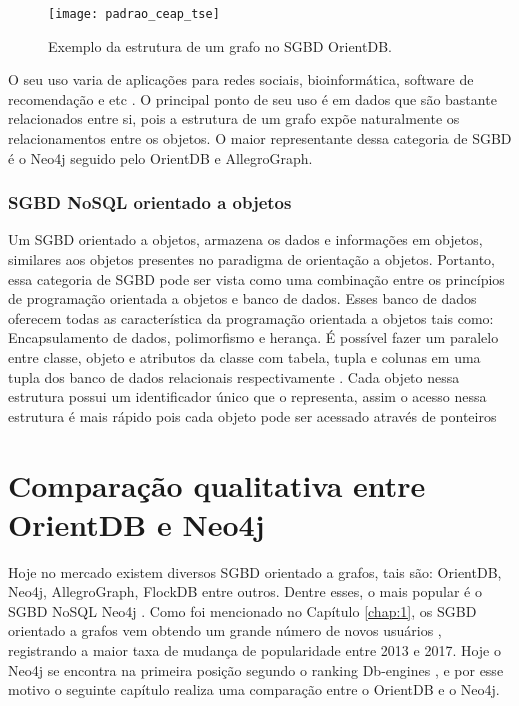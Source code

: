 \begin{figure}[h]
	\centering
    \texttt{[image: padrao\_ceap\_tse]}
    \caption{Exemplo da estrutura de um grafo no SGBD OrientDB.}
    \label{fig:graph_orientdb}
\end{figure}
	
	O seu uso varia de aplicações para redes sociais, bioinformática, software de recomendação e etc \cite{nayak2013type}. O principal ponto de seu uso é em dados que são bastante relacionados entre si, pois a estrutura de um grafo expõe naturalmente os relacionamentos entre os objetos. O maior representante dessa categoria de SGBD é o Neo4j seguido pelo OrientDB e AllegroGraph.
	
\subsubsection{SGBD NoSQL orientado a objetos}
	Um SGBD orientado a objetos, armazena os dados e informações em objetos, similares aos objetos presentes no paradigma de orientação a objetos. Portanto, essa categoria de SGBD pode ser vista como uma combinação entre os princípios de programação orientada a objetos e banco de dados. Esses banco de dados oferecem todas as característica da programação orientada a objetos tais como: Encapsulamento de dados, polimorfismo e herança. É possível fazer um paralelo entre classe, objeto e atributos da classe com tabela, tupla e colunas em uma tupla dos banco de dados relacionais respectivamente \cite{nayak2013type}. Cada objeto nessa estrutura possui um identificador único que o representa, assim o acesso nessa estrutura é mais rápido pois cada objeto pode ser acessado através de ponteiros

\section{Comparação qualitativa entre OrientDB e Neo4j} \label{comparison_graph_nosql}

	Hoje no mercado existem diversos SGBD orientado a grafos, tais são: OrientDB, Neo4j, AllegroGraph, FlockDB entre outros. Dentre esses, o mais popular é o SGBD NoSQL Neo4j \cite{neo4j-site}. Como foi mencionado no Capítulo \ref{chap:1}, os SGBD orientado a grafos vem obtendo um grande número de novos usuários \cite{Dbmspopularity}, registrando a maior taxa de mudança de popularidade entre 2013 e 2017. Hoje o Neo4j se encontra na primeira posição segundo o ranking Db-engines \cite{neo4jprimeiro}, e por esse motivo o seguinte capítulo realiza uma comparação entre o OrientDB e o Neo4j.
	
